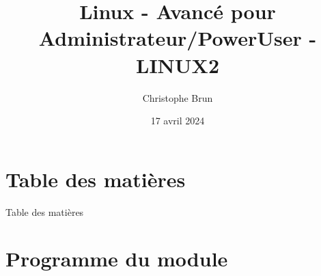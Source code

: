 \documentclass{beamer}
\title[LINUX2]{Linux - Avancé pour Administrateur/PowerUser - LINUX2}
\author{Christophe Brun}
\institute{Digicomp}
\date{17 avril 2024}
\begin{document}
    \begin{frame}
        \titlepage
    \end{frame}


    \section{Table des matières}\label{sec:toc}

    \begin{frame}{Table des matières}
        \tableofcontents
    \end{frame}


    \section{Programme du module}\label{sec:programme-du-module}
\end{document}
